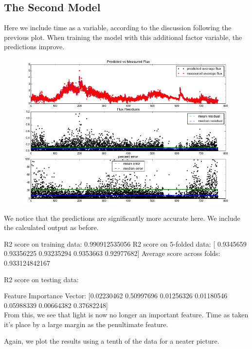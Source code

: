 \documentclass{article}
\begin{document}
\subsection*{The Second Model}
Here we include time as a variable, according to the discussion following the previous plot. When training the model with this additional factor variable, the predictions improve.

\begin{figure}[H]
	\includegraphics[width=\textwidth, height=\textheight, keepaspectratio]{rf2.png}
\end{figure}

We notice that the predictions are significantly more accurate here. We include the calculated output as before.

R2 score on training data:  0.990912535056
R2 score on 5-folded data:  [ 0.9345659   0.93356225  0.93235294  0.9353663   0.92977682]
Average score across folds:  0.933124842167

R2 score on testing data:

Feature Importance Vector: [0.02230462  0.50997696  0.01256326  0.01180546  0.05988339  0.00664382 0.37682248] \\

From this, we see that light is now no longer an important feature. Time as taken it's place by a large margin as the penultimate feature.

Again, we plot the results using a tenth of the data for a neater picture.
\end{document}
